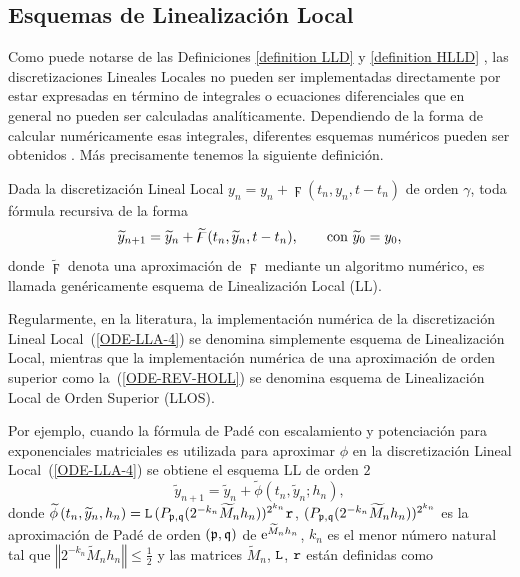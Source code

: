 \subsection{Esquemas de Linealización Local}

Como puede notarse de las Definiciones \ref{definition LLD} y \ref{definition HLLD} , las
discretizaciones Lineales Locales no pueden ser implementadas directamente por
estar expresadas en término de integrales o ecuaciones diferenciales que en general no pueden ser
calculadas analíticamente. Dependiendo de la forma de calcular  numéricamente esas integrales,
 diferentes esquemas numéricos pueden ser obtenidos \cite{Jimenez05AMC,Jimenez13}.
 Más precisamente tenemos la siguiente definición.
\begin{definition}
	\label{definition LLS} Dada la discretización Lineal Local 
	  $y_n=y_{n}+\digamma(t_{n},y_{n},t-t_{n})$
	 de orden $\gamma $, toda fórmula recursiva de la forma 
	\begin{equation*}
	 \widetilde{y}_{n+1}=\widetilde{y}_{n}+\widetilde{\digamma}(t_{n},\widetilde{y}_{n},t-t_{n})
	 , \text{ \ \ \ \
		\ con }\widetilde{y}_{0}=y_{0},
	\end{equation*}%
	donde $\widetilde{\digamma}$ denota una aproximación
	de $\digamma$ mediante un algoritmo numérico, es
	llamada genéricamente esquema de Linealización Local (LL).
\end{definition}
Regularmente, en la literatura, la implementación numérica de la discretización Lineal Local~(\ref{ODE-LLA-4}) se denomina simplemente esquema de Linealización Local, mientras que la implementación numérica de una aproximación de orden superior como la~(\ref{ODE-REV-HOLL}) se denomina esquema de Linealización Local de Orden Superior (LLOS).

Por ejemplo, cuando la fórmula de Padé con escalamiento y potenciación para exponenciales matriciales \cite{moler2003nineteen} es utilizada para
aproximar $\phi$ en la discretización Lineal Local~(\ref{ODE-LLA-4}) se obtiene el esquema LL de orden $2$ \cite{Jimenez02AMC}
\begin{equation} 
\widetilde{y}_{n+1}=\widetilde{y}_{n}+\widetilde{\phi}\left( t_{n},\widetilde{y}_{n};h_{n}\right), \label{LL-scheme}
\end{equation} 
donde $\widetilde{\phi }\left( t_{n},\widetilde{y}
_{n},h_{n}\right) =\mathtt{L}\,(P_{\mathfrak{p},\mathfrak{q}}(2^{-k_{n}}\widetilde{M}_{n}h_{n}))^{2^{k_{n}}}\mathtt{r}$, 
$(P_{\mathfrak{p},\mathfrak{q}}(2^{-k_{n}}\widetilde{M}_{n}h_{n}))^{2^{k_{n}}}$ es la aproximación
de Padé de orden $(\mathfrak{p},\mathfrak{q})$ de  $\mathrm{e}^{\widetilde{M}_{n}h_{n}}$, $k_{n}$ es el menor número natural tal que $\left\Vert 2^{-k_{n}}\widetilde{M}_{n}h_{n}\right\Vert \leq \frac{1}{2}$ 
y las matrices $\widetilde{M}_{n}$, $\mathtt{L}$, $\mathtt{r}$ están definidas como

